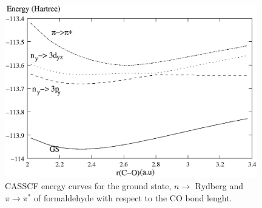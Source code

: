 \begin{center}
\begin{figure}[ht]
\begin{center}
\includegraphics[width=11cm,keepaspectratio]{03_nevpt/images/formaldehyde-cas-curve.eps}
\end{center}
\caption{\footnotesize CASSCF energy curves for the ground state, $n \rightarrow$
Rydberg and $\pi \rightarrow \pi^{*}$ of formaldehyde with respect to the CO
bond lenght.}
\label{fig:formaldehyde_cas_curve}
\end{figure}
\end{center}
